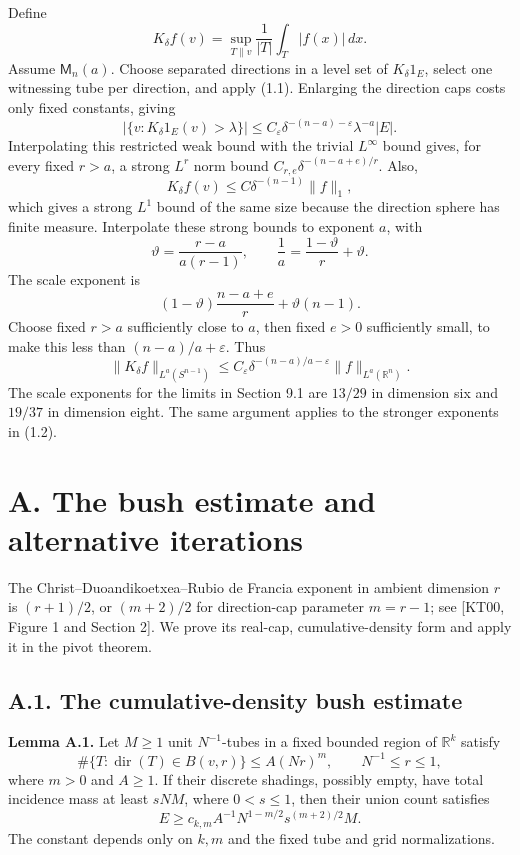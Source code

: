 \documentclass[
  11pt,
  a4paper,
]{article}
\begin{document}
Define \[
 K_\delta f(v)=\sup_{T\parallel v}\frac1{|T|}\int_T|f(x)|\,dx.
\] Assume \(\mathsf M_n(a)\). Choose separated directions in a level set
of \(K_\delta1_E\), select one witnessing tube per direction, and apply
(1.1). Enlarging the direction caps costs only fixed constants, giving
\[
 |\{v:K_\delta1_E(v)>\lambda\}|
 \le C_\varepsilon\delta^{-(n-a)-\varepsilon}
                         \lambda^{-a}|E|.          \tag{9.7}\label{eq:9.7}
\] Interpolating this restricted weak bound with the trivial
\(L^\infty\) bound gives, for every fixed \(r>a\), a strong \(L^r\) norm
bound \(C_{r,e}\delta^{-(n-a+e)/r}\). Also, \[
 K_\delta f(v)\le C\delta^{-(n-1)}\|f\|_1,
\] which gives a strong \(L^1\) bound of the same size because the
direction sphere has finite measure. Interpolate these strong bounds to
exponent \(a\), with \[
 \vartheta=\frac{r-a}{a(r-1)},\qquad
 \frac1a=\frac{1-\vartheta}{r}+\vartheta.
\] The scale exponent is \[
 (1-\vartheta)\frac{n-a+e}{r}+\vartheta(n-1).
\] Choose fixed \(r>a\) sufficiently close to \(a\), then fixed \(e>0\)
sufficiently small, to make this less than \((n-a)/a+\varepsilon\). Thus
\[
 \|K_\delta f\|_{L^a(S^{n-1})}
 \le C_\varepsilon\delta^{-(n-a)/a-\varepsilon}
                         \|f\|_{L^a(\mathbb R^n)}. \tag{9.8}\label{eq:9.8}
\] The scale exponents for the limits in Section 9.1 are \(13/29\) in
dimension six and \(19/37\) in dimension eight. The same argument
applies to the stronger exponents in (1.2).

\hypertarget{a.-the-bush-estimate-and-alternative-iterations}{%
\section{A. The bush estimate and alternative
iterations}\label{a.-the-bush-estimate-and-alternative-iterations}}

The Christ--Duoandikoetxea--Rubio de Francia exponent in ambient
dimension \(r\) is \((r+1)/2\), or \((m+2)/2\) for direction-cap
parameter \(m=r-1\); see {[}KT00, Figure 1 and Section 2{]}. We prove
its real-cap, cumulative-density form and apply it in the pivot theorem.

\hypertarget{a.1.-the-cumulative-density-bush-estimate}{%
\subsection{A.1. The cumulative-density bush
estimate}\label{a.1.-the-cumulative-density-bush-estimate}}

\textbf{Lemma A.1.} Let \(M\ge1\) unit \(N^{-1}\)-tubes in a fixed
bounded region of \(\mathbb R^k\) satisfy \[
\#\{T:\operatorname{dir}(T)\in B(v,r)\}
\le A(Nr)^m,
\qquad N^{-1}\le r\le1,
\] where \(m>0\) and \(A\ge1\). If their discrete shadings, possibly
empty, have total incidence mass at least \(sNM\), where \(0<s\le1\),
then their union count satisfies \[
E\ge c_{k,m}A^{-1}N^{1-m/2}s^{(m+2)/2}M.
\tag{A.1}\label{eq:A.1}
\] The constant depends only on \(k,m\) and the fixed tube and grid
normalizations.
\end{document}
